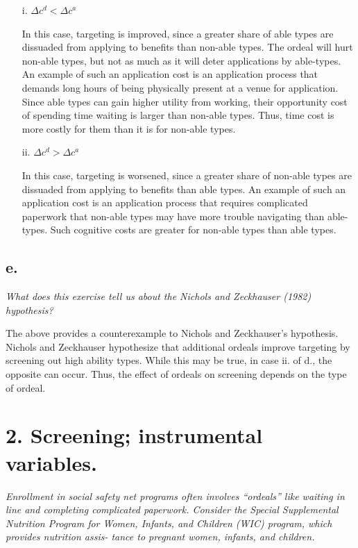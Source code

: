 \documentclass[
]{article}
\begin{document}
\begin{enumerate}  
\item[i.] $\Delta c^d < \Delta c^a$  
  

In this case, targeting is improved, since a greater share of able types are dissuaded from applying to benefits than non-able types. The ordeal will hurt non-able types, but not as much as it will deter applications by able-types. An example of such an application cost is an application process that demands long hours of being physically present at a venue for application. Since able types can gain higher utility from working, their opportunity cost of spending time waiting is larger than non-able types. Thus, time cost is more costly for them than it is for non-able types. 


\item[ii.] $\Delta c^d > \Delta c^a$  
  
  
In this case, targeting is worsened, since a greater share of non-able types are dissuaded from applying to benefits than able types. An example of such an application cost is an application process that requires complicated paperwork that non-able types may have more trouble navigating than able-types. Such cognitive costs are greater for non-able types than able types. 
\end{enumerate}

\hypertarget{e.}{%
\subsection{e.}\label{e.}}

\textit{What does this exercise tell us about the Nichols and Zeckhauser (1982) hypothesis?}

The above provides a counterexample to Nichols and Zeckhauser's
hypothesis. Nichols and Zeckhauser hypothesize that additional ordeals
improve targeting by screening out high ability types. While this may be
true, in case ii. of d., the opposite can occur. Thus, the effect of
ordeals on screening depends on the type of ordeal.

\hypertarget{screening-instrumental-variables.}{%
\section{2. Screening; instrumental
variables.}\label{screening-instrumental-variables.}}

\textit{Enrollment in social safety net programs often involves “ordeals” like waiting in line and completing complicated paperwork. Consider the Special Supplemental Nutrition Program for Women, Infants, and Children (WIC) program, which provides nutrition assis- tance to pregnant women, infants, and children.}
\end{document}
